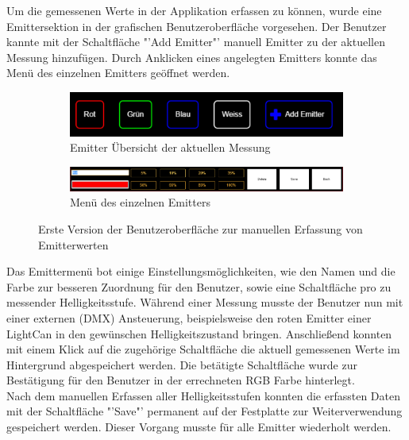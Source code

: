 \documentclass[11pt]{scrartcl}
\begin{document}
Um die gemessenen Werte in der Applikation erfassen zu können, wurde eine Emittersektion in der grafischen Benutzeroberfläche vorgesehen.
Der Benutzer kannte mit der Schaltfläche "'Add Emitter"' manuell Emitter zu der aktuellen Messung hinzufügen. Durch Anklicken eines angelegten
Emitters konnte das Menü des einzelnen Emitters geöffnet werden.
\begin{figure}[H]
    \centering
    \begin{subfigure}[b]{\textwidth}
        \includegraphics[width=\textwidth]{images/app_emitters_v1.png}
        \caption{Emitter Übersicht der aktuellen Messung}
    \end{subfigure}
    \hfill 
    \begin{subfigure}[b]{\textwidth}
        \includegraphics[width=\textwidth]{images/app_edit_emitters_v1.png}
        \caption{Menü des einzelnen Emitters}
    \end{subfigure}
    \caption{Erste Version der Benutzeroberfläche zur manuellen Erfassung von Emitterwerten}
\end{figure}
\noindent
Das Emittermenü bot einige Einstellungsmöglichkeiten, wie den Namen und die Farbe zur besseren Zuordnung für den Benutzer, sowie eine Schaltfläche pro zu messender
Helligkeitsstufe. Während einer Messung musste der Benutzer nun mit einer externen (DMX) Ansteuerung, beispielsweise den roten
Emitter einer LightCan in den gewünschen Helligkeitszustand bringen. Anschließend konnten mit einem Klick auf die zugehörige Schaltfläche die
aktuell gemessenen Werte im Hintergrund abgespeichert werden. Die betätigte Schaltfläche wurde zur Bestätigung für den Benutzer in der errechneten
RGB Farbe hinterlegt.\\
Nach dem manuellen Erfassen aller Helligkeitsstufen konnten die erfassten Daten mit der Schaltfläche "'Save"' permanent auf der Festplatte zur
Weiterverwendung gespeichert werden. Dieser Vorgang musste für alle Emitter wiederholt werden.
\end{document}
